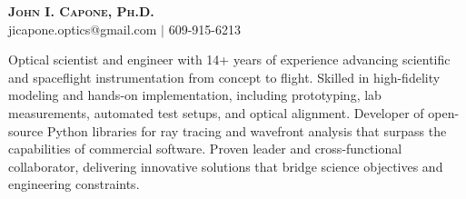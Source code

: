 \documentclass[letterpaper,11pt]{article}
\begin{document}
\begin{center}
    \textbf{\Huge \scshape John I. Capone, Ph.D.} \\ \vspace{1pt}
    \small jicapone.optics@gmail.com $|$ 609-915-6213\\ \vspace{2pt}
\end{center}

\begin{adjustwidth}{50pt}{50pt}
\raggedright
\small Optical scientist and engineer with 14+ years of experience advancing scientific and spaceflight instrumentation from concept to flight. Skilled in high-fidelity modeling and hands-on implementation, including prototyping, lab measurements, automated test setups, and optical alignment. Developer of open-source Python libraries for ray tracing and wavefront analysis that surpass the capabilities of commercial software. Proven leader and cross-functional collaborator, delivering innovative solutions that bridge science objectives and engineering constraints.
\end{adjustwidth}

\end{document}
